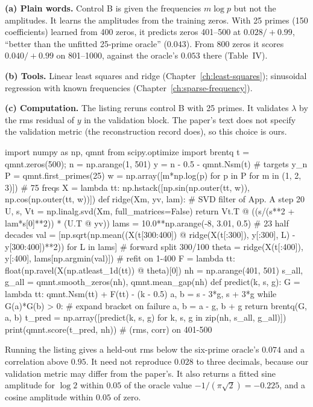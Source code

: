 \textbf{(a) Plain words.} Control B is given the frequencies $m\log p$ but not the amplitudes. It learns the amplitudes from the training zeros. With 25 primes (150 coefficients) learned from 400 zeros, it predicts zeros 401--500 at $0.028/+0.99$, ``better than the unfitted 25-prime oracle'' ($0.043$). From 800 zeros it scores $0.040/+0.99$ on 801--1000, against the oracle's $0.053$ there (Table~IV).

\textbf{(b) Tools.} Linear least squares and ridge (Chapter~\ref{ch:least-squares}); sinusoidal regression with known frequencies (Chapter~\ref{ch:sparse-frequency}).

\textbf{(c) Computation.} The listing reruns control B with 25 primes. It validates $\lambda$ by the rms residual of $y$ in the validation block. The paper's text does not specify the validation metric (the reconstruction record \cite{zenodo} does), so this choice is ours.

\begin{pycode}
import numpy as np, qmnt
from scipy.optimize import brentq
t = qmnt.zeros(500); n = np.arange(1, 501)
y = n - 0.5 - qmnt.Nsm(t)                            # targets y_n
P = qmnt.first_primes(25)
w = np.array([m*np.log(p) for p in P for m in (1, 2, 3)])   # 75 freqs
X = lambda tt: np.hstack([np.sin(np.outer(tt, w)), np.cos(np.outer(tt, w))])
def ridge(Xm, yv, lam):                              # SVD filter of App. A step 20
    U, s, Vt = np.linalg.svd(Xm, full_matrices=False)
    return Vt.T @ ((s/(s**2 + lam*s[0]**2)) * (U.T @ yv))
lams = 10.0**np.arange(-8, 3.01, 0.5)                # 23 half decades
val = [np.sqrt(np.mean((X(t[300:400]) @ ridge(X(t[:300]), y[:300], L)
       - y[300:400])**2)) for L in lams]             # forward split 300/100
theta = ridge(X(t[:400]), y[:400], lams[np.argmin(val)])   # refit on 1-400
F = lambda tt: float(np.ravel(X(np.atleast_1d(tt)) @ theta)[0])
nh = np.arange(401, 501)
s_all, g_all = qmnt.smooth_zeros(nh), qmnt.mean_gap(nh)
def predict(k, s, g):
    G = lambda tt: qmnt.Nsm(tt) + F(tt) - (k - 0.5)
    a, b = s - 3*g, s + 3*g
    while G(a)*G(b) > 0:                              # expand bracket on failure
        a, b = a - g, b + g
    return brentq(G, a, b)
t_pred = np.array([predict(k, s, g) for k, s, g in zip(nh, s_all, g_all)])
print(qmnt.score(t_pred, nh))                        # (rms, corr) on 401-500
\end{pycode}

Running the listing gives a held-out rms below the six-prime oracle's $0.074$ and a correlation above $0.95$. It need not reproduce $0.028$ to three decimals, because our validation metric may differ from the paper's. It also returns a fitted sine amplitude for $\log 2$ within $0.05$ of the oracle value $-1/(\pi\sqrt2)=-0.225$, and a cosine amplitude within $0.05$ of zero.

